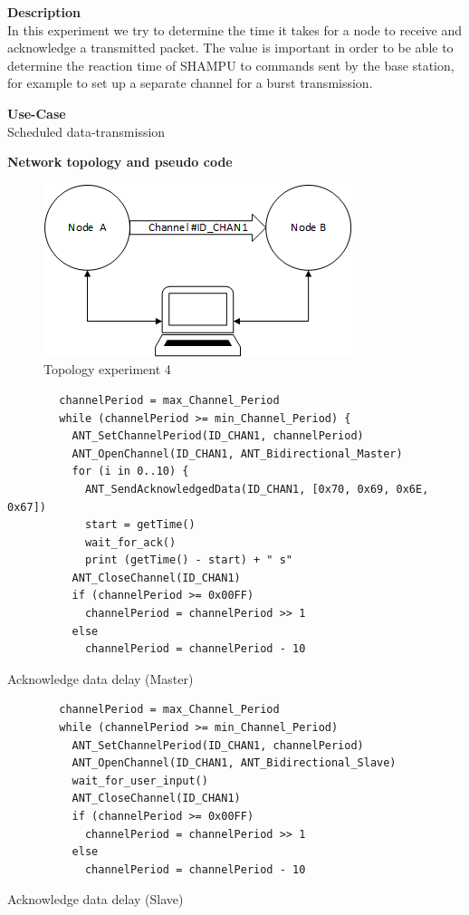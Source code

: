 \begin{description} 
	\item{\textbf{Description}} \hfill \\ In this experiment we try to determine the time it takes for a node to receive and acknowledge a transmitted packet. The value is important in order to be able to determine the reaction time of SHAMPU to commands sent by the base station, for example to set up a separate channel for a burst transmission.
	\item{\textbf{Use-Case}} \hfill \\ Scheduled data-transmission
	\item{\textbf{Network topology and pseudo code}} \hfill \\ 
	\begin{figure}[H]
		\centering
		\includegraphics[scale=1]{content/images/exp_topo.png}
		\caption{Topology experiment 4}
	\end{figure}
	\begin{code}[H]
		\begin{verbatim}
		channelPeriod = max_Channel_Period
		while (channelPeriod >= min_Channel_Period) {
		  ANT_SetChannelPeriod(ID_CHAN1, channelPeriod)
		  ANT_OpenChannel(ID_CHAN1, ANT_Bidirectional_Master)
		  for (i in 0..10) {
		    ANT_SendAcknowledgedData(ID_CHAN1, [0x70, 0x69, 0x6E, 0x67])
		    start = getTime()	   
		    wait_for_ack()		
		    print (getTime() - start) + " s"	  
		  ANT_CloseChannel(ID_CHAN1)		
		  if (channelPeriod >= 0x00FF)
		    channelPeriod = channelPeriod >> 1
		  else
		    channelPeriod = channelPeriod - 10
		\end{verbatim}
		\caption{Acknowledge data delay (Master)}\label{lst:mExp4}
	\end{code}
	
	\begin{code}[H]
		\begin{verbatim}
		channelPeriod = max_Channel_Period
		while (channelPeriod >= min_Channel_Period)
		  ANT_SetChannelPeriod(ID_CHAN1, channelPeriod)
		  ANT_OpenChannel(ID_CHAN1, ANT_Bidirectional_Slave)
		  wait_for_user_input()
		  ANT_CloseChannel(ID_CHAN1)
		  if (channelPeriod >= 0x00FF)
		    channelPeriod = channelPeriod >> 1
		  else
		    channelPeriod = channelPeriod - 10
		\end{verbatim}
		\caption{Acknowledge data delay (Slave)}\label{lst:sExp4}
	\end{code}
	

\end{description}

